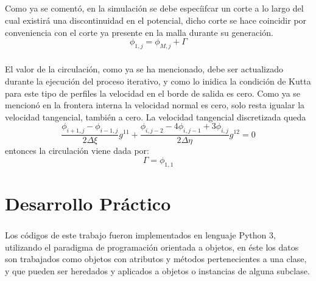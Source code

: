\documentclass[letterpaper, openright, 12pt]{book}
\begin{document}
    \paragraph*{}
        Como ya se comentó, en la simulación se debe especíifcar un corte a lo
        largo del cual existirá una discontinuidad en el potencial, dicho corte
        se hace coincidir por conveniencia con el corte ya presente en la malla
        durante su generación.
        \begin{equation}
            \phi_{1, j} = \phi_{M, j} + \Gamma
        \end{equation}

    \paragraph*{}
        El valor de la circulación, como ya se ha mencionado, debe ser
        actualizado durante la ejecución del proceso iterativo, y como lo
        inidica la condición de Kutta para este tipo de perfiles la velocidad
        en el borde de salida es cero. Como ya se mencionó en la frontera
        interna la velocidad normal es cero, solo resta igualar la velocidad
        tangencial, también a cero. La velocidad tangencial discretizada queda
        \begin{equation}
            \frac{\phi_{i+1, j} - \phi_{i-1, j}}{2 \Delta \xi} g^{11}
            + \frac{\phi_{i, j-2} - 4 \phi_{i, j-1} + 3 \phi_{i, j}}{2 \Delta \eta}
                g^{12} = 0
        \end{equation}
        entonces la circulación viene dada por:
        \begin{equation}
            \Gamma = \phi_{1, 1}
        \end{equation}

%
%
%
%
%

%
%
%
%
%

\chapter{Desarrollo Práctico}
    \paragraph*{}
        Los códigos de este trabajo fueron implementados en lenguaje Python 3,
        utilizando el paradigma de programación orientada a objetos, en éste los
        datos son trabajados como objetos con atributos y métodos pertenecientes
        a una clase, y que pueden ser heredados y aplicados a objetos o
        instancias de alguna subclase.
\end{document}
